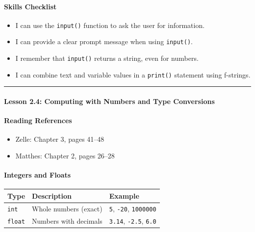 \documentclass[
  justified,
  openright,
]{tufte-book}
\let\subsection\paragraph
\let\paragraph\paragraph
\let\subsection\paragraph
\let\paragraph\paragraph
\providecommand{\tightlist}{%
  \setlength{\itemsep}{0pt}\setlength{\parskip}{0pt}}
\begin{document}
\subsection{Skills Checklist}\label{skills-checklist-9}

\begin{itemize}
\tightlist
\item[$\square$]
  I can use the \texttt{input()} function to ask the user for
  information.
\item[$\square$]
  I can provide a clear prompt message when using \texttt{input()}.
\item[$\square$]
  I remember that \texttt{input()} returns a string, even for numbers.
\item[$\square$]
  I can combine text and variable values in a \texttt{print()} statement
  using f-strings.
\end{itemize}

\begin{center}\rule{0.5\linewidth}{0.5pt}\end{center}

\subsection{Lesson 2.4: Computing with Numbers and Type
Conversions}\label{lesson-2.4-computing-with-numbers-and-type-conversions}

\subsection{Reading References}\label{reading-references-10}

\begin{itemize}
\tightlist
\item
  Zelle: Chapter 3, pages 41--48
\item
  Matthes: Chapter 2, pages 26--28
\end{itemize}

\subsection{Integers and Floats}\label{integers-and-floats}

\begin{fullwidth}{\def\LTcaptype{none} %
\begin{longtable}[]{@{}lll@{}}
\toprule\noalign{}
Type & Description & Example \\
\midrule\noalign{}
\endhead
\bottomrule\noalign{}
\endlastfoot
\texttt{int} & Whole numbers (exact) & \texttt{5}, \texttt{-20},
\texttt{1000000} \\
\texttt{float} & Numbers with decimals & \texttt{3.14}, \texttt{-2.5},
\texttt{6.0} \\
\end{longtable}
}
\end{fullwidth}
\end{document}
